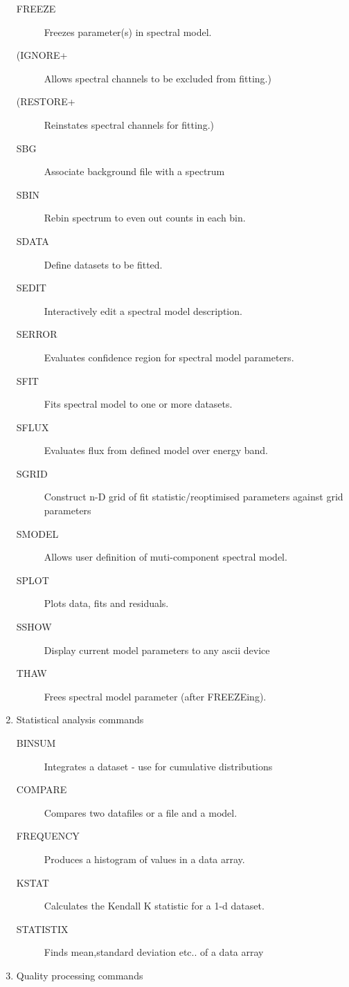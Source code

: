 \documentclass{book}
\renewcommand{\_}{{\tt\char'137}}     %
\begin{document}
\begin{enumerate}
\begin{description}
\item[FREEZE]
Freezes parameter(s) in spectral model.
\item[(IGNORE+]
Allows spectral channels to be excluded from fitting.)
\item[(RESTORE+]
Reinstates spectral channels for fitting.)
\item[SBG]
Associate background file with a spectrum
\item[SBIN]
Rebin spectrum to even out counts in each bin.
\item[SDATA]
Define datasets to be fitted.
\item[SEDIT]
Interactively edit a spectral model description.
\item[SERROR]
Evaluates confidence region for spectral model parameters.
\item[SFIT]
Fits spectral model to one or more datasets.
\item[SFLUX]
Evaluates flux from defined model over energy band.
\item[SGRID]
Construct n-D grid of fit statistic/reoptimised
parameters against grid parameters
\item[SMODEL]
Allows user definition of muti-component spectral model.
\item[SPLOT]
Plots data, fits and residuals.
\item[SSHOW]
Display current model parameters to any ascii device
\item[THAW]
Frees spectral model parameter (after FREEZEing).
\end{description}
\item Statistical analysis commands

\begin{description}
\item[BINSUM]
Integrates a dataset - use for cumulative distributions
\item[COMPARE]
Compares two datafiles or a file and a model.
\item[FREQUENCY]
Produces a histogram of values in a data array.
\item[KSTAT]
Calculates the Kendall K statistic for a 1-d dataset.
\item[STATISTIX]
Finds mean,standard deviation etc.. of a data array
\end{description}
\item Quality processing commands


\end{enumerate}
\end{document}
